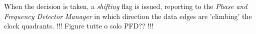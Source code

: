 \documentclass[11pt]{article}
\renewcommand{\>}{\rangle} \renewcommand{\emptyset}{\varnothing}
\begin{document}
When the decision is taken, a \textit{shifting} flag is issued, reporting to the
\textit{Phase and Frequency Detector Manager} in which direction the data edges
are 'climbing' the clock quadrants. !!! Figure tutte o solo PFD?? !!!
\end{document}
